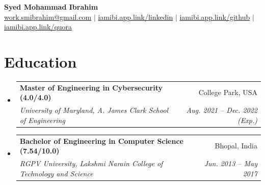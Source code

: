 \documentclass[letterpaper,11pt]{article}
\makeatletter
\newcommand{\resumeSubheading}[4]{
  \vspace{-2pt}\item
    \begin{tabular*}{0.97\textwidth}[t]{l@{\extracolsep{\fill}}r}
      \textbf{#1} & #2 \\
      \textit{\small#3} & \textit{\small #4} \\
    \end{tabular*}\vspace{-7pt}
}
\newcommand{\resumeSubHeadingListStart}{\begin{itemize}[leftmargin=0.15in, label={}]}
\newcommand{\resumeSubHeadingListEnd}{\end{itemize}}
\makeatother
\begin{document}

\begin{center}
    \textbf{\Huge{Syed Mohammad Ibrahim}} \\ \vspace{1pt}
    \href{mailto:work.smibrahim@gmail.com}{work.smibrahim@gmail.com} $|$
    \href{https://iamibi.app.link/linkedin}{iamibi.app.link/linkedin} $|$
    \href{https://iamibi.app.link/github}{iamibi.app.link/github} $|$
    \href{https://iamibi.app.link/quora}{iamibi.app.link/quora}
\end{center}

\section{Education}
  \resumeSubHeadingListStart
    \resumeSubheading
      {Master of Engineering in Cybersecurity (4.0/4.0)}{College Park, USA}
      {University of Maryland, A. James Clark School of Engineering}{Aug. 2021 -- Dec. 2022 (Exp.)}
    \resumeSubheading
      {Bachelor of Engineering in Computer Science (7.54/10.0)}{Bhopal, India}
      {RGPV University, Lakshmi Narain College of Technology and Science}{Jun. 2013 -- May 2017}
  \resumeSubHeadingListEnd
\end{document}
